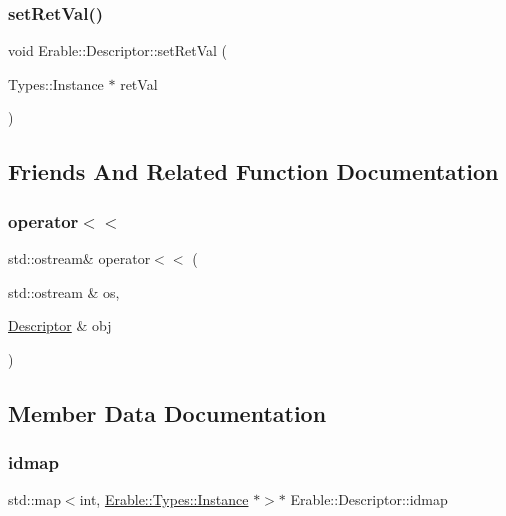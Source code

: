 \subsubsection{\texorpdfstring{setRetVal()}{setRetVal()}}
{\footnotesize\ttfamily void Erable\+::\+Descriptor\+::set\+Ret\+Val (\begin{DoxyParamCaption}\item[{Types\+::\+Instance $\ast$}]{ret\+Val }\end{DoxyParamCaption})\hspace{0.3cm}{\ttfamily [inline]}}



\subsection{Friends And Related Function Documentation}
\mbox{\label{class_erable_1_1_descriptor_abaf13535a8e1086f647a9d13e73d778e}} 
\subsubsection{\texorpdfstring{operator$<$$<$}{operator<<}}
{\footnotesize\ttfamily std\+::ostream\& operator$<$$<$ (\begin{DoxyParamCaption}\item[{std\+::ostream \&}]{os,  }\item[{\mbox{\hyperlink{class_erable_1_1_descriptor}{Descriptor}} \&}]{obj }\end{DoxyParamCaption})\hspace{0.3cm}{\ttfamily [friend]}}



\subsection{Member Data Documentation}
\mbox{\label{class_erable_1_1_descriptor_a10946ca25cb512e8a4c765c517509c7f}} 
\subsubsection{\texorpdfstring{idmap}{idmap}}
{\footnotesize\ttfamily std\+::map$<$int, \mbox{\hyperlink{class_erable_1_1_erable_1_1_types_1_1_instance}{Erable\+::\+Types\+::\+Instance}} $\ast$$>$$\ast$ Erable\+::\+Descriptor\+::idmap\hspace{0.3cm}{\ttfamily [private]}}

